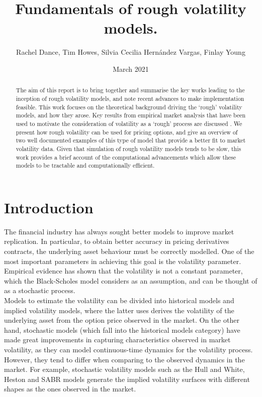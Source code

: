 \documentclass[12pt,oneside]{article}
\title{Fundamentals of rough volatility models.}
\date{ March 2021 }
\author{Rachel Dance, Tim Howes, Silvia Cecilia Hernández Vargas, Finlay Young}
\begin{document}
  \maketitle

  \begin{abstract}The aim of this report is to bring together and summarise the key works leading to the inception of rough volatility models, and note recent advances to make implementation feasible. This work focuses on the theoretical background driving the `rough' volatility models, and how they arose. Key results from empirical market analysis that have been used to motivate the consideration of volatility as a `rough' process are discussed \cite{Gatheral2014}. We present how rough volatility can be used for pricing options, and give an overview of two well documented examples of this type of model that provide a better fit to market volatility data. Given that simulation of rough volatility models tends to be slow, this work provides a brief account of the computational advancements which allow these models to be tractable and computationally efficient.
  \end{abstract}

  \tableofcontents
 \newpage

\section{Introduction}
The financial industry has always sought better models to improve market replication. In particular, to obtain better accuracy in pricing derivatives contracts, the underlying asset behaviour must be correctly modelled. One of the most important parameters in achieving this goal is the volatility parameter. Empirical evidence has shown that the volatility is not a constant parameter, which the Black-Scholes model considers as an assumption, and can be thought of as a stochastic process.
\\

Models to estimate the volatility can be divided into historical models and implied volatility models, where the latter uses derives the volatility of the underlying asset from the option price observed in the market. On the other hand, stochastic models (which fall into the historical models category) have made great improvements in capturing characteristics observed in market volatility, as they can model continuous-time dynamics for the volatility process. However, they tend to differ when comparing to the observed dynamics in the market. For example, stochastic volatility models such as the Hull and White, Heston and SABR models generate the implied volatility surfaces with different shapes as the ones observed in the market. 
\\
\end{document}
